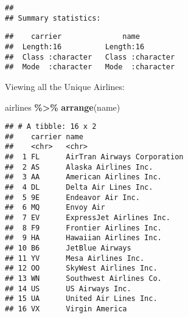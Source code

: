 \documentclass[
]{article}
\newenvironment{Shaded}{\begin{snugshade}}{\end{snugshade}}
\newcommand{\FunctionTok}[1]{\textcolor[rgb]{0.13,0.29,0.53}{\textbf{#1}}}
\newcommand{\NormalTok}[1]{#1}
\newcommand{\SpecialCharTok}[1]{\textcolor[rgb]{0.81,0.36,0.00}{\textbf{#1}}}
\begin{document}
\begin{verbatim}
## 
## Summary statistics:
\end{verbatim}

\begin{verbatim}
##    carrier              name          
##  Length:16          Length:16         
##  Class :character   Class :character  
##  Mode  :character   Mode  :character
\end{verbatim}

Viewing all the Unique Airlines:

\begin{Shaded}
\begin{Highlighting}[]
\NormalTok{airlines }\SpecialCharTok{\%\textgreater{}\%}
  \FunctionTok{arrange}\NormalTok{(name)}
\end{Highlighting}
\end{Shaded}

\begin{verbatim}
## # A tibble: 16 x 2
##    carrier name                       
##    <chr>   <chr>                      
##  1 FL      AirTran Airways Corporation
##  2 AS      Alaska Airlines Inc.       
##  3 AA      American Airlines Inc.     
##  4 DL      Delta Air Lines Inc.       
##  5 9E      Endeavor Air Inc.          
##  6 MQ      Envoy Air                  
##  7 EV      ExpressJet Airlines Inc.   
##  8 F9      Frontier Airlines Inc.     
##  9 HA      Hawaiian Airlines Inc.     
## 10 B6      JetBlue Airways            
## 11 YV      Mesa Airlines Inc.         
## 12 OO      SkyWest Airlines Inc.      
## 13 WN      Southwest Airlines Co.     
## 14 US      US Airways Inc.            
## 15 UA      United Air Lines Inc.      
## 16 VX      Virgin America
\end{verbatim}
\end{document}
